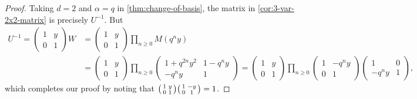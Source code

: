 \documentclass[reqno,11pt]{amsart}
\theoremstyle{definition}
\theoremstyle{remark}
\numberwithin{equation}{section}
\newenvironment{psmall}
  {\left(\begin{smallmatrix}}
  {\end{smallmatrix}\right)}
\begin{document}
\begin{proof}
Taking $d = 2$ and $\alpha = q$ in \cref{thm:change-of-basis}, the matrix in \cref{cor:3-var-2x2-matrix} is precisely $U^{-1}$. But
\[
\begin{aligned}
    U^{-1} = \begin{pmatrix}
    1 & y \\
    0 & 1
    \end{pmatrix}
    W
    &=
    \begin{pmatrix}
    1 & y \\
    0 & 1
    \end{pmatrix}
    \prod_{n \ge 0} M\left(q^n y\right)
    \\
    &=
    \begin{pmatrix}
    1 & y \\
    0 & 1
    \end{pmatrix}
    \prod_{n \ge 0}
    \begin{pmatrix}
    1 + q^{2n}y^2 & 1 - q^n y \\
    -q^n y & 1
    \end{pmatrix}
    =
    \begin{pmatrix}
    1 & y \\
    0 & 1
    \end{pmatrix}
    \prod_{n \ge 0}
    \begin{pmatrix}
    1 & -q^n y \\
    0 & 1
    \end{pmatrix}
    \begin{pmatrix}
    1 & 0 \\
    -q^n y & 1
    \end{pmatrix},
\end{aligned}
\]
which completes our proof by noting that $\begin{psmall} 1 & y \\ 0 & 1 \end{psmall} \begin{psmall} 1 & -y \\ 0 & 1 \end{psmall} = 1$.
\end{proof}
\end{document}
